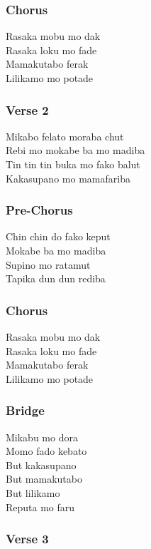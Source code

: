 \subsubsection{Chorus}\label{chorus-44}

Rasaka mobu mo dak\\
Rasaka loku mo fade\\
Mamakutabo ferak\\
Lilikamo mo potade

\subsubsection{Verse 2}\label{verse-2-20}

Mikabo felato moraba chut\\
Rebi mo mokabe ba mo madiba\\
Tin tin tin buka mo fako balut\\
Kakasupano mo mamafariba

\subsubsection{Pre-Chorus}\label{pre-chorus-22}

Chin chin do fako keput\\
Mokabe ba mo madiba\\
Supino mo ratamut\\
Tapika dun dun rediba

\subsubsection{Chorus}\label{chorus-45}

Rasaka mobu mo dak\\
Rasaka loku mo fade\\
Mamakutabo ferak\\
Lilikamo mo potade

\subsubsection{Bridge}\label{bridge-16}

Mikabu mo dora\\
Momo fado kebato\\
But kakasupano\\
But mamakutabo\\
But lilikamo\\
Reputa mo faru

\subsubsection{Verse 3}\label{verse-3-9}

